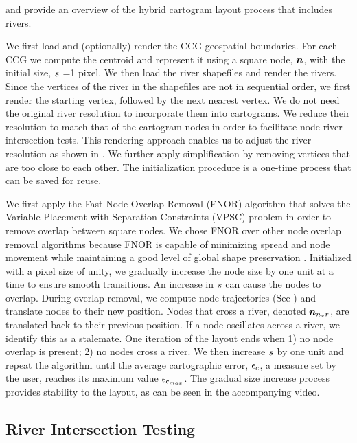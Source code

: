  and  provide an overview of the hybrid cartogram layout process that includes rivers.

 We first load and (optionally) render the CCG geospatial boundaries. For each CCG we compute the centroid and represent it using a square node, $ \bm{n} $, with the initial size, $ s $ =1 pixel. We then load the river shapefiles and render the rivers. Since the vertices of the river in the shapefiles are not in sequential order, we first render the starting vertex, followed by the next nearest vertex. We do not need the original river resolution to incorporate them into cartograms. We reduce their resolution to match that of the cartogram nodes in order to facilitate node-river intersection tests. This rendering approach enables us to adjust the river resolution as shown in . We further apply simplification by removing vertices that are too close to each other. The initialization procedure is a one-time process that can be saved for reuse.


 We first apply the Fast Node Overlap Removal (FNOR) algorithm that solves the Variable Placement with Separation Constraints (VPSC) problem \cite{dwyer2006Fast} in order to remove overlap between square nodes. We chose FNOR over other node overlap removal algorithms because FNOR is capable of minimizing spread and node movement while maintaining a good level of global shape preservation \cite{chen2020Node}. Initialized with a pixel size of unity, we gradually increase the node size by one unit at a time to ensure smooth transitions. An increase in $ s $ can cause the nodes to overlap. During overlap removal, we compute node trajectories (See ) and translate nodes to their new position. Nodes that cross a river, denoted $ \bm{n}_{n_{x}r} $, are translated back to their previous position. If a node oscillates across a river, we identify this as a stalemate. One iteration of the layout ends when 1) no node overlap is present; 2) no nodes cross a river. We then increase $ s $ by one unit and repeat the algorithm until the average cartographic error, $ \epsilon_{c} $, a measure set by the user, reaches its maximum value $ \epsilon_{c_{max}} $. The gradual size increase process provides stability to the layout, as can be seen in the accompanying video.

\subsection{River Intersection Testing}
\label{subsec:{River Intersection Testing}}

